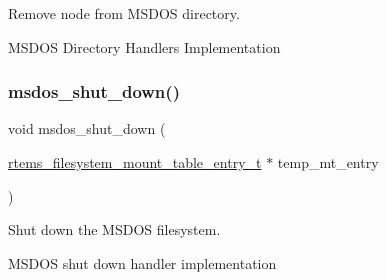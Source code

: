 Remove node from M\+S\+D\+OS directory. 

M\+S\+D\+OS Directory Handlers Implementation \mbox{\label{group__libfs__msdos_gada4176631aabceb7071617611720a04a}} 
\subsubsection{\texorpdfstring{msdos\_shut\_down()}{msdos\_shut\_down()}}
{\footnotesize\ttfamily void msdos\+\_\+shut\+\_\+down (\begin{DoxyParamCaption}\item[{\mbox{\hyperlink{structrtems__filesystem__mount__table__entry__tt}{rtems\+\_\+filesystem\+\_\+mount\+\_\+table\+\_\+entry\+\_\+t}} $\ast$}]{temp\+\_\+mt\+\_\+entry }\end{DoxyParamCaption})}



Shut down the M\+S\+D\+OS filesystem. 

M\+S\+D\+OS shut down handler implementation 